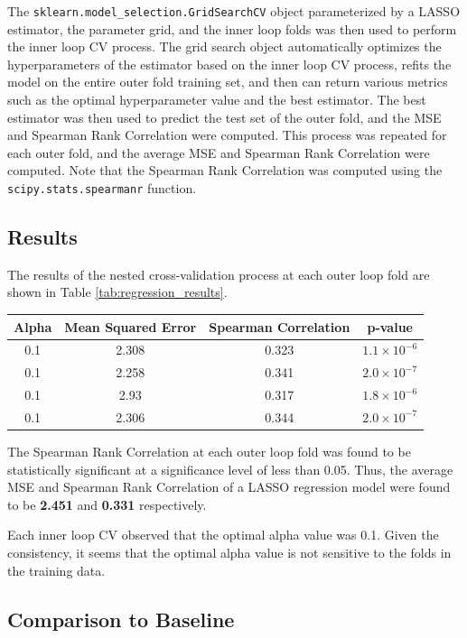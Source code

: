 \documentclass[12pt]{article}
\begin{document}
The \verb|sklearn.model_selection.GridSearchCV| object parameterized by a LASSO estimator, the parameter grid, and the inner loop folds was then used to perform the inner loop CV process. The grid search object automatically optimizes the hyperparameters of the estimator based on the inner loop CV process, refits the model on the entire outer fold training set, and then can return various metrics such as the optimal hyperparameter value and the best estimator. The best estimator was then used to predict the test set of the outer fold, and the MSE and Spearman Rank Correlation were computed. This process was repeated for each outer fold, and the average MSE and Spearman Rank Correlation were computed. Note that the Spearman Rank Correlation was computed using the \verb|scipy.stats.spearmanr| function.

\subsection{Results}
The results of the nested cross-validation process at each outer loop fold are shown in Table \ref{tab:regression_results}.

\begin{center}
    \begin{tabular}{|c|c|c|c|}
    \hline
    Alpha & Mean Squared Error & Spearman Correlation & p-value \\
    \hline
    0.1 & 2.308 & 0.323 & $1.1 \times 10^{-6}$ \\
    0.1 & 2.258 & 0.341 & $2.0 \times 10^{-7}$ \\
    0.1 & 2.93 & 0.317 & $1.8 \times 10^{-6}$ \\
    0.1 & 2.306 & 0.344 & $2.0 \times 10^{-7}$ \\
    \hline
    \end{tabular}
    \label{tab:regression_results}
\end{center}

The Spearman Rank Correlation at each outer loop fold was found to be statistically significant at a significance level of less than 0.05. Thus, the average MSE and Spearman Rank Correlation of a LASSO regression model were found to be \textbf{2.451} and \textbf{0.331} respectively.

Each inner loop CV observed that the optimal alpha value was 0.1. Given the consistency, it seems that the optimal alpha value is not sensitive to the folds in the training data. 

\subsection{Comparison to Baseline}

\newpage



\end{document}
